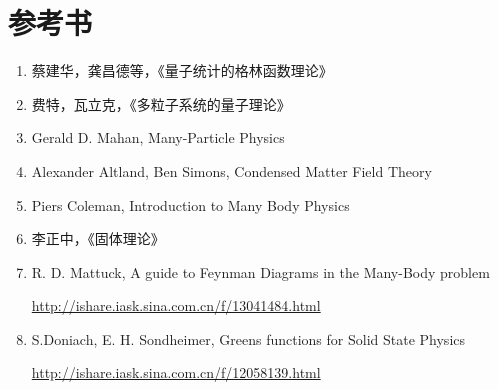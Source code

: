 \section*{参考书}

\begin{enumerate}

\item

蔡建华，龚昌德等，《量子统计的格林函数理论》


\item 

费特，瓦立克，《多粒子系统的量子理论》


\item

Gerald D. Mahan, Many-Particle Physics


\item

Alexander Altland, Ben Simons, Condensed Matter Field Theory


\item

Piers Coleman, Introduction to Many Body Physics



\item

李正中，《固体理论》



\item

R. D. Mattuck,  A guide to Feynman Diagrams in the Many-Body problem
 
\url{http://ishare.iask.sina.com.cn/f/13041484.html}

\item

S.Doniach, E. H. Sondheimer, Greens functions for Solid State Physics

\url{http://ishare.iask.sina.com.cn/f/12058139.html}

\end{enumerate}